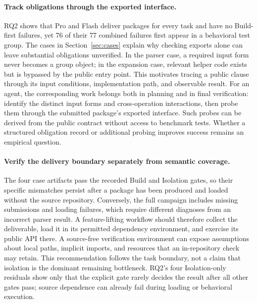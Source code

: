 \documentclass[acmsmall,screen,review,anonymous,nonacm]{acmart}
\begin{document}
\paragraph{Track obligations through the exported interface.}
RQ2 shows that Pro and Flash deliver packages for every task and have no
Build-first failures, yet 76 of their 77 combined failures first appear in a
behavioral test group. The cases in Section~\ref{sec:cases} explain why checking
exports alone can leave substantial obligations unverified. In the parser case,
a required input form never becomes a group object; in the expansion case,
relevant helper code exists but is bypassed by the public entry point. This
motivates tracing a public clause through its input conditions, implementation
path, and observable result. For an agent, the corresponding work belongs both
in planning and in final verification: identify the distinct input forms and
cross-operation interactions, then probe them through the submitted package's
exported interface. Such probes can be derived from the public contract without
access to benchmark tests. Whether a structured obligation record or additional
probing improves success remains an empirical question.

\paragraph{Verify the delivery boundary separately from semantic coverage.}
The four case artifacts pass the recorded Build and Isolation gates, so their
specific mismatches persist after a package has been produced and loaded without
the source repository. Conversely, the full campaign includes missing submissions and
loading failures, which require different diagnoses from an incorrect parser
result. A feature-lifting workflow should therefore collect the deliverable,
load it in its permitted dependency environment, and exercise its public API
there. A source-free verification environment can expose assumptions about local
paths, implicit imports, and resources that an in-repository check may retain.
This recommendation follows the task boundary, not a claim that isolation is
the dominant remaining bottleneck. RQ2's four Isolation-only residuals show only
that the explicit gate rarely decides the result after all other gates pass;
source dependence can already fail during loading or behavioral execution.
\end{document}
